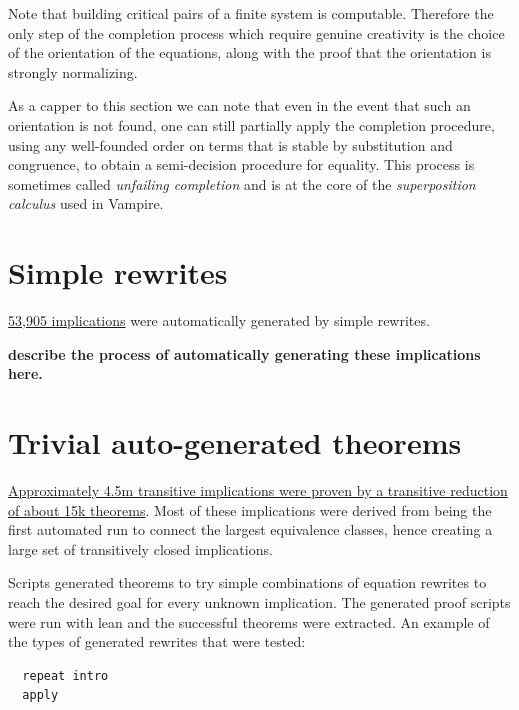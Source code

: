 Note that building critical pairs of a finite system is computable. Therefore the only step of the completion process which require genuine creativity is the choice of the orientation of the equations, along with the proof that the orientation is strongly normalizing.

As a capper to this section we can note that even in the event that such an orientation is not found, one can still partially apply the completion procedure, using any well-founded order on terms that is stable by substitution and congruence, to obtain a semi-decision procedure for equality. This process is sometimes called \emph{unfailing completion} and is at the core of the \emph{superposition calculus} used in Vampire.


\chapter{Simple rewrites}\label{simple-rewrite-chapter}

\href{https://github.com/teorth/equational_theories/tree/main/equational_theories/SimpleRewrites/theorems}{53,905 implications} were automatically generated by simple rewrites.

{\bf describe the process of automatically generating these implications here.}


\chapter{Trivial auto-generated theorems}\label{trivial-auto-chapter}

\href{https://github.com/teorth/equational_theories/tree/main/equational_theories/Generated/TrivialBruteforce}{Approximately 4.5m transitive implications were proven by a transitive reduction of about 15k theorems}. Most of these implications were derived from being the first automated run to connect the largest equivalence classes, hence creating a large set of transitively closed implications.

Scripts generated theorems to try simple combinations of equation rewrites to reach the desired goal for every unknown implication. The generated proof scripts were run with lean and the successful theorems were extracted. An example of the types of generated rewrites that were tested:

\begin{verbatim}
  repeat intro
  apply
\end{verbatim}

